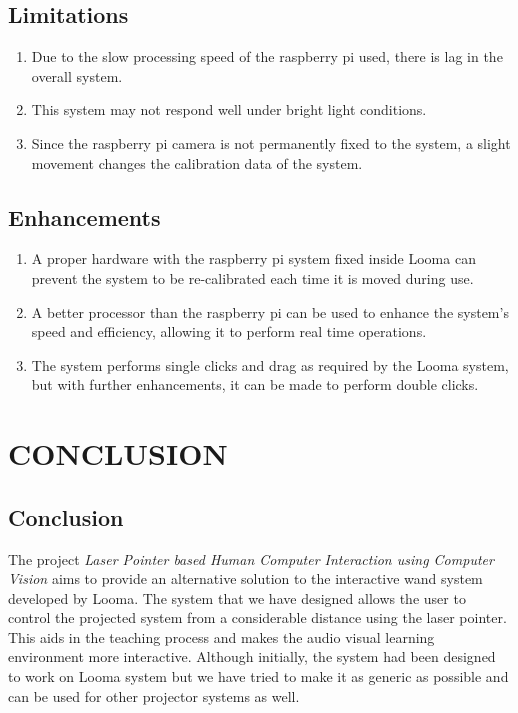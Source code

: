 \documentclass[12pt, a4paper]{article}
\begin{document}
\subsection{Limitations}

\begin{enumerate}
\item Due to the slow processing speed of the raspberry pi used, there is lag in the overall system. 
\item This system may not respond well under bright light conditions.
\item Since the raspberry pi camera is not permanently fixed to the system, a slight movement changes the calibration data of the system.

\end{enumerate}

\subsection{Enhancements}
\begin{enumerate}
\item A proper hardware with the raspberry pi system fixed inside Looma can prevent the system to be re-calibrated each time it is moved during use.
\item A better processor than the raspberry pi can be used to enhance the system’s speed and efficiency, allowing it to perform real time operations.
\item The system performs single clicks and drag as required by the Looma system, but with further enhancements, it can be made to perform double clicks.
\end{enumerate}
\newpage
\section{CONCLUSION}
\subsection{Conclusion}
The project \emph{Laser Pointer based Human Computer Interaction using Computer Vision} aims to provide an alternative solution to the interactive wand system developed by Looma. The system that we have designed allows the user to control the projected system from a considerable distance using the laser pointer. This aids in the teaching process and makes the audio visual learning environment more interactive. Although initially, the system had been designed to work on Looma system but we have tried to make it as generic as possible and can be used for other projector systems as well. 
\end{document}

